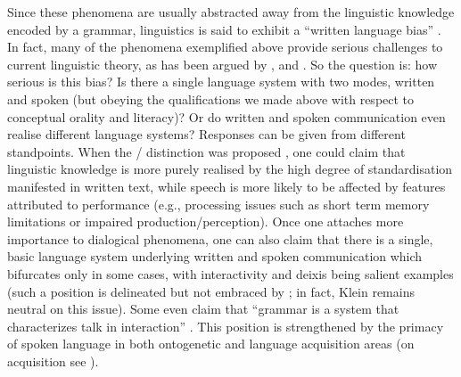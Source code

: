 \documentclass[output=paper]{langsci/langscibook}
\begin{document}
Since these phenomena are usually abstracted away from the linguistic knowledge encoded by a grammar, linguistics is said to exhibit a \enquote{written language bias}  \citep{Linell:1982}.
%
In fact, many of the phenomena exemplified above provide serious challenges  to current  linguistic theory, as has been argued by \citet{Ginzburg:2012}, \citet{Ginzburg:Poesio:2016} and \citet{Kempson:Cann:Gregoromichelaki:Chatzikyriakidis:2016}.
%
So the question is: how serious is this bias? 
%
Is there a single language system with two modes, written and spoken (but obeying the qualifications we made above with respect to conceptual orality and literacy)?
%
Or do written and spoken communication even realise different language systems?
%
Responses can be given from different standpoints. 
%
When the /  distinction was proposed \citep{Chomsky:1969}, one could claim that linguistic knowledge is more purely realised by the high degree of standardisation manifested in written text, while speech is more likely to be affected by features attributed to performance (e.g.,  processing issues such as short term memory limitations or impaired production/perception).
%
Once one attaches more importance to dialogical phenomena, one can also claim that there is a single, basic language system underlying written and spoken communication which bifurcates only in some cases, with interactivity and deixis being salient examples (such a position is delineated but not embraced by \citet{Klein:1985}; in fact, Klein remains neutral on this issue). 
%
Some even claim that \enquote{grammar is a system that characterizes talk in interaction} \citep[p.~1]{Ginzburg:Poesio:2016}. 
%
This position is strengthened by the primacy of spoken language in both ontogenetic and language acquisition areas (on acquisition see ).
\end{document}
